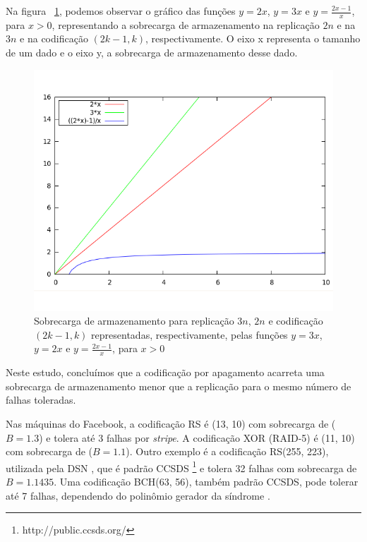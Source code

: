 Na figura ~\ref{fig1:sarc}, podemos observar o gráfico das funções $y = 2x$, $y = 3x$ e $y = \frac{2x-1}{x}$, para $x>0$,  representando a sobrecarga de armazenamento na replicação $2n$ e na $3n$ e na codificação $(2k-1,k)$, respectivamente. O eixo x representa o tamanho de um dado e o eixo y, a sobrecarga de armazenamento desse dado.

    \vspace*{2cm}
    \begin{figure}[h]
      \centering
      \includegraphics[scale=0.69]{figuras/gnuplot-replicacao-codificacao-3.png}
      \caption{Sobrecarga de armazenamento para replicação $3n$, $2n$ e codificação $(2k-1,k)$ representadas, respectivamente, pelas funções $y = 3x$, $y = 2x$ e $y = \frac{2x-1}{x}$, para $x>0$}
      \label{fig1:sarc}
    \end{figure}

Neste estudo, concluímos que a codificação por apagamento acarreta uma sobrecarga de armazenamento menor que a replicação para o mesmo número de falhas toleradas. 

Nas máquinas do Facebook, a codificação RS é (13, 10) com sobrecarga de ($B=1.3$) e tolera até 3 falhas por \emph{stripe}. A codificação XOR (RAID-5) é (11, 10) com sobrecarga de ($B=1.1$). Outro exemplo é a codificação RS(255, 223), utilizada pela DSN \cite{TDD:2010}, que é padrão CCSDS \footnote{http://public.ccsds.org/} e tolera 32 falhas com sobrecarga de $B=1.1435$. Uma codificação BCH(63, 56), também padrão CCSDS, pode tolerar até 7 falhas, dependendo do polinômio gerador da síndrome \cite{Almeida:2007} . 

